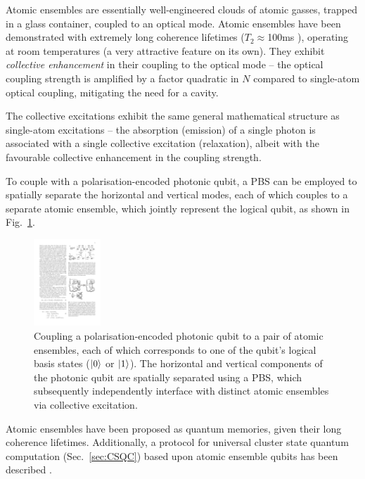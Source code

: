 Atomic ensembles are essentially well-engineered clouds of atomic gasses, trapped in a glass container, coupled to an optical mode. Atomic ensembles have been demonstrated with extremely long coherence lifetimes ($T_2\approx$100ms ), operating at room temperatures (a very attractive feature on its own). They exhibit \textit{collective enhancement} in their coupling to the optical mode -- the optical coupling strength is amplified by a factor quadratic in $N$ compared to single-atom optical coupling, mitigating the need for a cavity.

The collective excitations exhibit the same general mathematical structure as single-atom excitations -- the absorption (emission) of a single photon is associated with a single collective excitation (relaxation), albeit with the favourable collective enhancement in the coupling strength.

To couple with a polarisation-encoded photonic qubit, a PBS can be employed to spatially separate the horizontal and vertical modes, each of which couples to a separate atomic ensemble, which jointly represent the logical qubit, as shown in Fig.~\ref{fig:atomic_ensemble_qubit}.

\begin{figure}[htpb]
\includegraphics[width=0.225\textwidth]{atomic_ensemble_qubit}
\caption{Coupling a polarisation-encoded photonic qubit to a pair of atomic ensembles, each of which corresponds to one of the qubit's logical basis states ($|0\rangle$ or $|1\rangle$). The horizontal and vertical components of the photonic qubit are spatially separated using a PBS, which subsequently independently interface with distinct atomic ensembles via collective excitation.} \label{fig:atomic_ensemble_qubit}
\end{figure}

Atomic ensembles have been proposed as quantum memories, given their long coherence lifetimes. Additionally, a protocol for universal cluster state quantum computation (Sec.~\ref{sec:CSQC}) based upon atomic ensemble qubits has been described \cite{bib:RohdeAtEns10}.

